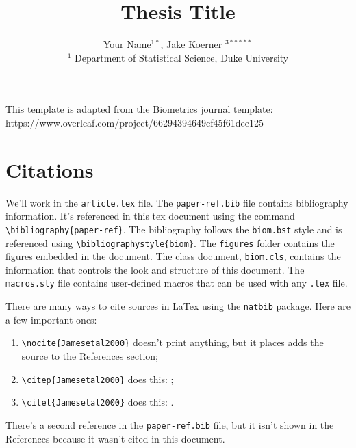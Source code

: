 \documentclass[useAMS, referee, usenatbib]{biom}
\title{Thesis Title}
\author{Your Name$^{1*}$\email{your.name@duke.edu}, Jake Koerner $^{3*****}$\email{jrkoerne@ncsu.edu} \\
$^1$ Department of Statistical Science, Duke University}
\begin{document}
\pagerange{\pageref{firstpage}--\pageref{lastpage}} 
\volume{}
\pubyear{}
\artmonth{}

\doi{}

\label{firstpage}


\begin{abstract}
\lipsum[1]
\end{abstract}

\maketitle

\noindent
This template is adapted from the Biometrics journal template:\\
https://www.overleaf.com/project/66294394649cf45f61dee125

\section*{Citations}
We'll work in the \texttt{article.tex} file.
The \texttt{paper-ref.bib} file contains bibliography information. It's referenced in this tex document using the command \texttt{\textbackslash bibliography\{paper-ref\}}. The bibliography follows the \texttt{biom.bst} style and is referenced using \texttt{\textbackslash bibliographystyle\{biom\}}. The \texttt{figures} folder contains the figures embedded in the document. The class document, \texttt{biom.cls}, contains the information that controls the look and structure of this document. The \texttt{macros.sty} file contains user-defined macros that can be used with any \texttt{.tex} file.

\noindent
There are many ways to cite sources in LaTex using the \texttt{natbib} package. Here are a few important ones:
\begin{enumerate}
\item \texttt{\textbackslash nocite\{Jamesetal2000\}} doesn't print anything, but it places adds the source to the References section\nocite{Jamesetal2000};
\item \texttt{\textbackslash citep\{Jamesetal2000\}} does this: \citep{Jamesetal2000};
\item \texttt{\textbackslash citet\{Jamesetal2000\}} does this: \citet{Jamesetal2000}.
\end{enumerate}
There's a second reference in the \texttt{paper-ref.bib} file, but it isn't shown in the References because it wasn't cited in this document.
\end{document}
